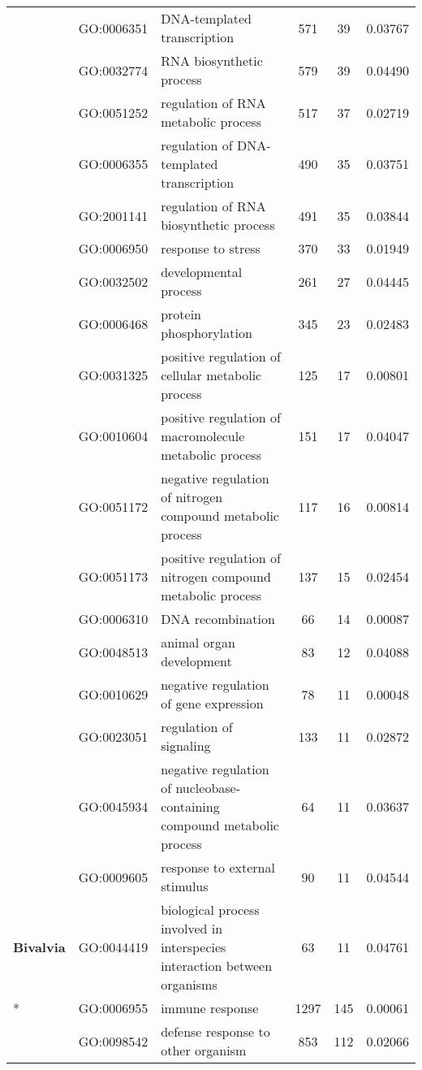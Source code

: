 \documentclass[../main.tex]{subfiles}
\begin{document}
\begin{landscape}
\begin{longtable}{@{}lllccr@{}}
     & GO:0006351 & DNA-templated transcription & 571 & 39 & 0.03767 \\
     & GO:0032774 & RNA biosynthetic process & 579 & 39 & 0.04490 \\
     & GO:0051252 & regulation of RNA metabolic process & 517 & 37 & 0.02719 \\
     & GO:0006355 & regulation of DNA-templated transcription & 490 & 35 & 0.03751 \\
     & GO:2001141 & regulation of RNA biosynthetic process & 491 & 35 & 0.03844 \\
     & GO:0006950 & response to stress & 370 & 33 & 0.01949 \\
     & GO:0032502 & developmental process & 261 & 27 & 0.04445 \\
     & GO:0006468 & protein phosphorylation & 345 & 23 & 0.02483 \\
     & GO:0031325 & positive regulation of cellular metabolic process & 125 & 17 & 0.00801 \\
     & GO:0010604 & positive regulation of macromolecule metabolic process & 151 & 17 & 0.04047 \\
     & GO:0051172 & negative regulation of nitrogen compound metabolic process & 117 & 16 & 0.00814 \\
     & GO:0051173 & positive regulation of nitrogen compound metabolic process & 137 & 15 & 0.02454 \\
     & GO:0006310 & DNA recombination & 66 & 14 & 0.00087 \\
     & GO:0048513 & animal organ development & 83 & 12 & 0.04088 \\
     & GO:0010629 & negative regulation of gene expression & 78 & 11 & 0.00048 \\
     & GO:0023051 & regulation of signaling & 133 & 11 & 0.02872 \\
     & GO:0045934 & negative regulation of nucleobase-containing compound metabolic process & 64 & 11 & 0.03637 \\
     & GO:0009605 & response to external stimulus & 90 & 11 & 0.04544 \\
    \multirow{1}{*}{\textbf{Bivalvia}} & GO:0044419 & biological process involved in interspecies interaction between organisms & 63 & 11 & 0.04761 \\* \midrule
    \multirow{22}{*}{\textbf{Mammalia}} & GO:0006955 & immune response & 1297 & 145 & 0.00061 \\
     & GO:0098542 & defense response to other organism & 853 & 112 & 0.02066 \\

\end{longtable}
\end{landscape}
\end{document}
